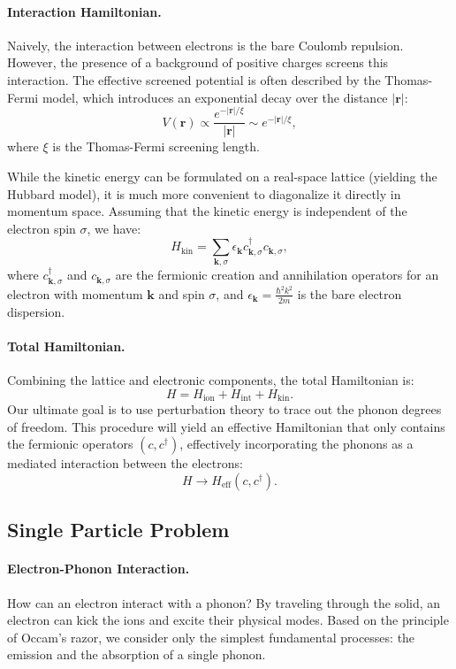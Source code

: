 \paragraph{Interaction Hamiltonian.} Naively, the interaction between electrons is the bare Coulomb repulsion. However, the presence of a background of positive charges screens this interaction. The effective screened potential is often described by the Thomas-Fermi model, which introduces an exponential decay over the distance \(|\mathbf{r}|\):
\[
    V(\mathbf{r}) \propto \frac{e^{-|\mathbf{r}|/\xi}}{|\mathbf{r}|} \sim e^{-|\mathbf{r}|/\xi},
\]
where \(\xi\) is the Thomas-Fermi screening length.

While the kinetic energy can be formulated on a real-space lattice (yielding the Hubbard model), it is much more convenient to diagonalize it directly in momentum space. Assuming that the kinetic energy is independent of the electron spin \(\sigma\), we have:
\[
    H_{\text{kin}} = \sum_{\mathbf{k}, \sigma} \epsilon_{\mathbf{k}} c_{\mathbf{k}, \sigma}^\dagger c_{\mathbf{k}, \sigma},
\]
where \(c_{\mathbf{k}, \sigma}^\dagger\) and \(c_{\mathbf{k}, \sigma}\) are the fermionic creation and annihilation operators for an electron with momentum \(\mathbf{k}\) and spin \(\sigma\), and \(\epsilon_{\mathbf{k}} = \frac{\hbar^2 k^2}{2m}\) is the bare electron dispersion.

\paragraph{Total Hamiltonian.} Combining the lattice and electronic components, the total Hamiltonian is:
\[
    H = H_{\text{ion}} + H_{\text{int}} + H_{\text{kin}}.
\]
Our ultimate goal is to use perturbation theory to trace out the phonon degrees of freedom. This procedure will yield an effective Hamiltonian that only contains the fermionic operators \((c, c^\dagger)\), effectively incorporating the phonons as a mediated interaction between the electrons:
\[
    H \to H_{\text{eff}}(c, c^\dagger).
\]

\subsection{Single Particle Problem}

\paragraph{Electron-Phonon Interaction.} How can an electron interact with a phonon? By traveling through the solid, an electron can kick the ions and excite their physical modes. Based on the principle of Occam's razor, we consider only the simplest fundamental processes: the emission and the absorption of a single phonon.

